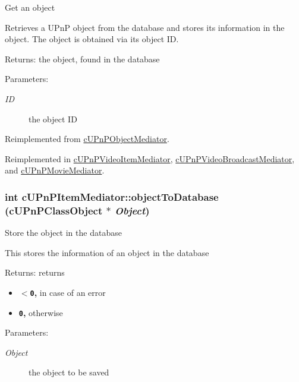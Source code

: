 Get an object

Retrieves a UPnP object from the database and stores its information in the object. The object is obtained via its object ID.

\begin{Desc}
\item[Returns:]the object, found in the database \end{Desc}
\begin{Desc}
\item[Parameters:]
\begin{description}
\item[{\em ID}]the object ID \end{description}
\end{Desc}
  

Reimplemented from \hyperlink{classcUPnPObjectMediator_5b4fff612476fb51690919f9c59899a5}{cUPnPObjectMediator}.

Reimplemented in \hyperlink{classcUPnPVideoItemMediator_dd8927340a69d247965ef9250adefb21}{cUPnPVideoItemMediator}, \hyperlink{classcUPnPVideoBroadcastMediator_c13bf0f008f49b0ab499542391998a24}{cUPnPVideoBroadcastMediator}, and \hyperlink{classcUPnPMovieMediator_d85b240eb54efd9ab46c440b51c71e83}{cUPnPMovieMediator}.\hypertarget{classcUPnPItemMediator_6d954b1cfdc4a7d55981c6ebff9d6d04}{
\subsubsection[{objectToDatabase}]{\setlength{\rightskip}{0pt plus 5cm}int cUPnPItemMediator::objectToDatabase ({\bf cUPnPClassObject} $\ast$ {\em Object})}}
\label{classcUPnPItemMediator_6d954b1cfdc4a7d55981c6ebff9d6d04}


Store the object in the database

This stores the information of an object in the database

\begin{Desc}
\item[Returns:]returns\begin{itemize}
\item {\bf {\tt $<$0},} in case of an error\item {\bf {\tt 0},} otherwise \end{itemize}
\end{Desc}
\begin{Desc}
\item[Parameters:]
\begin{description}
\item[{\em Object}]the object to be saved \end{description}
\end{Desc}
 

